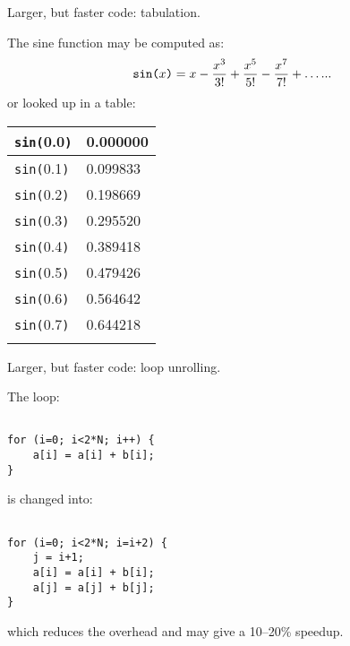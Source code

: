 \begin{slide*}
Larger, but faster code: tabulation.

The sine function may be computed as:
$$
\mbox{\tt sin(}x\mbox{\tt )} = x - \frac{x^3}{3!} + \frac{x^5}{5!} - \frac{x^7}{7!} + \ldots...
$$
or looked up in a table:\\

\begin{scriptsize}
\begin{center}
\begin{tabular}{|l|l|}
\hline
{\tt sin(}0.0{\tt )} & 0.000000 \\\hline
{\tt sin(}0.1{\tt )} & 0.099833\\ \hline
{\tt sin(}0.2{\tt )} & 0.198669\\\hline
{\tt sin(}0.3{\tt )} & 0.295520\\\hline
{\tt sin(}0.4{\tt )} & 0.389418\\\hline
{\tt sin(}0.5{\tt )} & 0.479426\\\hline
{\tt sin(}0.6{\tt )} & 0.564642\\\hline
{\tt sin(}0.7{\tt )} & 0.644218\\\hline
& 
\end{tabular}
\end{center}
\end{scriptsize}
\vfil
\end{slide*}
 
\begin{slide*}
Larger, but faster code: loop unrolling.

The loop:

\begin{scriptsize}
\begin{verbatim}

for (i=0; i<2*N; i++) {
    a[i] = a[i] + b[i];
}

\end{verbatim}
\end{scriptsize}

is changed into:

\begin{scriptsize}
\begin{verbatim}

for (i=0; i<2*N; i=i+2) {
    j = i+1;
    a[i] = a[i] + b[i];
    a[j] = a[j] + b[j];
}

\end{verbatim}
\end{scriptsize}

which reduces the overhead and may give a 10--20\% speedup.

\vfil
\end{slide*}
 
